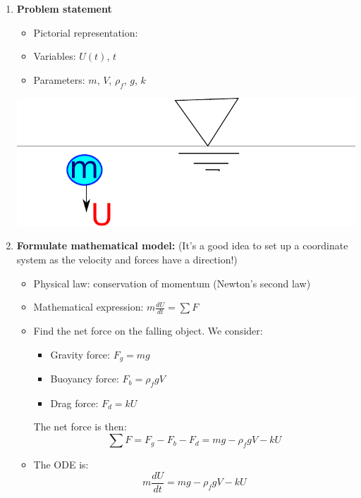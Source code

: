 \begin{enumerate}
\item \textbf{Problem statement}

\begin{minipage}{0.6\textwidth}
\begin{itemize}
\item Pictorial representation:
\item Variables: $U(t)$, $t$
\item Parameters: $m$, $V$, $\rho_f$, $g$, $k$
\end{itemize}
\end{minipage}
\hspace{0.05\textwidth}
\begin{minipage}{0.25\textwidth}
\includegraphics[width=\textwidth]{figs/terminalVelocity.pdf} 
\end{minipage}
\item \textbf{Formulate mathematical model:} (It's a good idea to set up a coordinate system as the velocity and forces have a direction!)\\
\begin{itemize}
\item Physical law: conservation of momentum (Newton's second law)
\item Mathematical expression: $m\frac{dU}{dt}=\sum F$
\item Find the net force on the falling object. We consider:
\begin{itemize}
\item Gravity force: $F_g=mg$
\item Buoyancy force: $F_b=\rho_f g V$
\item Drag force: $F_d = k U$
\end{itemize}
The net force is then:
\begin{equation}
\sum F=F_g-F_b-F_d=mg-\rho_f g V-kU
\end{equation}
\item The ODE is:
\begin{equation}
m\frac{dU}{dt}=mg-\rho_f g V-kU

\end{equation}
\end{itemize}
\end{enumerate}
